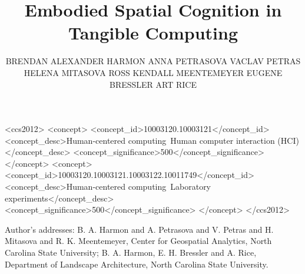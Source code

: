 \documentclass[prodmode,acmtochi]{acmsmall} %
\begin{document}

\title{Embodied Spatial Cognition in Tangible Computing} %
\author{BRENDAN ALEXANDER HARMON
ANNA PETRASOVA
VACLAV PETRAS
HELENA MITASOVA
ROSS ​KENDALL MEENTEMEYER
EUGENE BRESSLER
ART RICE
}

\begin{abstract}
%
\end{abstract}

%
%
\begin{CCSXML}
<ccs2012>
<concept>
<concept_id>10003120.10003121</concept_id>
<concept_desc>Human-centered computing~Human computer interaction (HCI)</concept_desc>
<concept_significance>500</concept_significance>
</concept>
<concept>
<concept_id>10003120.10003121.10003122.10011749</concept_id>
<concept_desc>Human-centered computing~Laboratory experiments</concept_desc>
<concept_significance>500</concept_significance>
</concept>
</ccs2012>
\end{CCSXML}

%
%



\begin{bottomstuff}
Author's addresses: B. A. Harmon {and} A. Petrasova {and} V. Petras {and} H. Mitasova {and} R. K. Meentemeyer, Center for Geospatial Analytics, North Carolina State University; B. A. Harmon, E. H. Bressler {and} A. Rice, Department of Landscape Architecture, North Carolina State University.
\end{bottomstuff}
\end{document}
